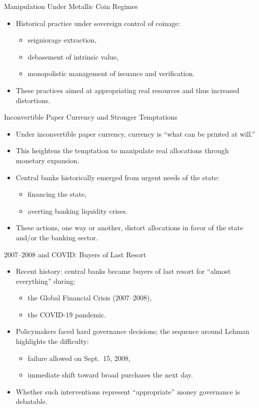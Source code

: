 \documentclass[11pt,aspectratio=169]{beamer}
\begin{document}
\begin{frame}{Manipulation Under Metallic Coin Regimes}
\small
\begin{itemize}
  \item Historical practice under sovereign control of coinage:
  \begin{itemize}
    \item seigniorage extraction,
    \item debasement of intrinsic value,
    \item monopolistic management of issuance and verification.
  \end{itemize}
  \item These practices aimed at appropriating real resources and thus increased distortions.
\end{itemize}
\end{frame}

\begin{frame}{Inconvertible Paper Currency and Stronger Temptations}
\small
\begin{itemize}
  \item Under inconvertible paper currency, currency is ``what can be printed at will.''
  \item This heightens the temptation to manipulate real allocations through monetary expansion.
  \item Central banks historically emerged from urgent needs of the state:
  \begin{itemize}
    \item financing the state,
    \item averting banking liquidity crises.
  \end{itemize}
  \item These actions, one way or another, distort allocations in favor of the state and/or the banking sector.
\end{itemize}
\end{frame}

\begin{frame}{2007--2008 and COVID: Buyers of Last Resort}
\small
\begin{itemize}
  \item Recent history: central banks became buyers of last resort for ``almost everything'' during:
  \begin{itemize}
    \item the Global Financial Crisis (2007--2008),
    \item the COVID-19 pandemic.
  \end{itemize}
  \item Policymakers faced hard governance decisions; the sequence around Lehman highlights the difficulty:
  \begin{itemize}
    \item failure allowed on Sept.\ 15, 2008,
    \item immediate shift toward broad purchases the next day.
  \end{itemize}
  \item Whether such interventions represent ``appropriate'' money governance is debatable.
\end{itemize}
\end{frame}
\end{document}
